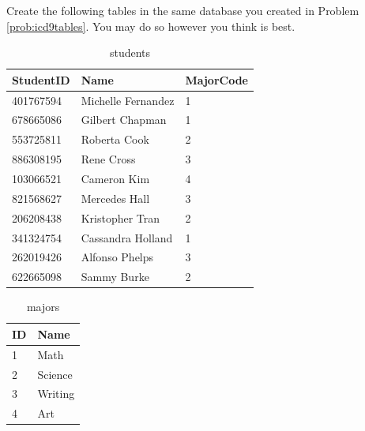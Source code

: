 \begin{problem}
Create the following tables in the same database you created in Problem \ref{prob:icd9tables}.  You may do so however you think is best.

\begin{table}[H]
\begin{tabular}{|l|l|l|}
\hline
StudentID & Name & MajorCode \\
\hline
401767594 & Michelle Fernandez & 1 \\
678665086 & Gilbert Chapman & 1 \\
553725811 & Roberta Cook & 2 \\
886308195 & Rene Cross & 3 \\
103066521 & Cameron Kim & 4 \\
821568627 & Mercedes Hall & 3 \\
206208438 & Kristopher Tran & 2 \\
341324754 & Cassandra Holland & 1 \\
262019426 & Alfonso Phelps & 3 \\
622665098 & Sammy Burke &2 \\
\hline
\end{tabular}
\caption{students}
\end{table}

\begin{table}[H]
\begin{tabular}{|l|l|}
\hline
ID & Name \\
\hline
1 & Math \\
2 & Science \\
3 & Writing \\
4 & Art \\
\hline
\end{tabular}
\caption{majors}
\end{table}


\end{problem}
